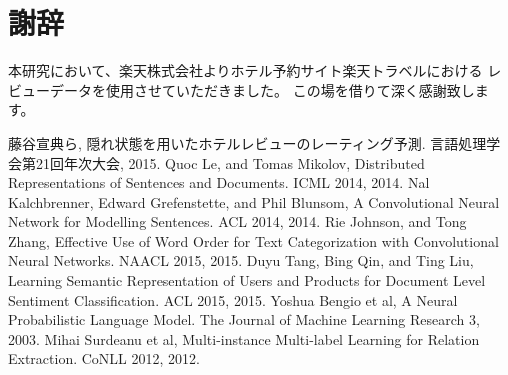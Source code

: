 \documentclass{ttithesis}
\begin{document}
\section*{謝辞}
本研究において、楽天株式会社よりホテル予約サイト楽天トラベルにおける
レビューデータを使用させていただきました。
この場を借りて深く感謝致します。




\begin{thebibliography}{9}
  藤谷宣典ら,
  隠れ状態を用いたホテルレビューのレーティング予測.
  言語処理学会第21回年次大会, 2015.
  Quoc Le, and Tomas Mikolov,
  Distributed Representations of Sentences and Documents.
  ICML 2014, 2014.
  Nal Kalchbrenner, Edward Grefenstette, and Phil Blunsom,
  A Convolutional Neural Network for Modelling Sentences.
  ACL 2014, 2014.
  Rie Johnson, and Tong Zhang,
  Effective Use of Word Order for Text Categorization
  with Convolutional Neural Networks.
  NAACL 2015, 2015.
  Duyu Tang, Bing Qin, and Ting Liu,
  Learning Semantic Representation of Users and Products
  for Document Level Sentiment Classification.
  ACL 2015, 2015.
  Yoshua Bengio et al,
  A Neural Probabilistic Language Model.
  The Journal of Machine Learning Research 3, 2003.
  Mihai Surdeanu et al,
  Multi-instance Multi-label Learning for Relation Extraction.
  CoNLL 2012, 2012.
\end{thebibliography}
\end{document}
